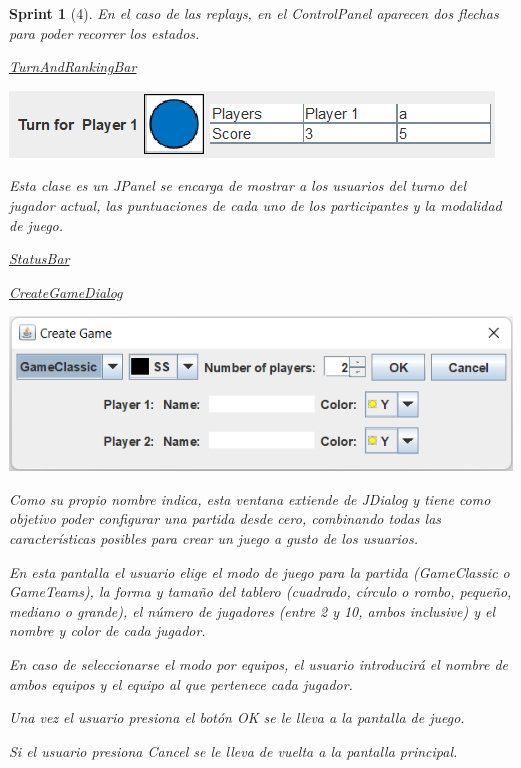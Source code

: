 \documentclass[12pt,a4paper,openright]{book}
\theoremstyle{break}
\newtheorem*{sprint}{Sprint}
\begin{document}
\begin{sprint}[4]
En el caso de las \textit{replays}, en el \textit{ControlPanel} aparecen dos flechas para poder recorrer los estados.

\underline{TurnAndRankingBar}
\begin{center}
\includegraphics[scale=1]{turn-ranking-panel-sprint3.png}
\end{center}

Esta clase es un \textit{JPanel} se encarga de mostrar a los usuarios del turno del jugador actual, las puntuaciones de cada uno de los participantes y la modalidad de juego.

\underline{StatusBar}


\underline{CreateGameDialog}
\begin{center}
\includegraphics[scale=0.8]{create-game-sprint3.png}
\end{center}

Como su propio nombre indica, esta ventana extiende de \textit{JDialog} y tiene como objetivo poder configurar una partida desde cero, combinando todas las características posibles para crear un juego a gusto de los usuarios.

En esta pantalla el usuario elige el modo de juego para la partida (\textit{GameClassic} o \textit{GameTeams}), la forma y tamaño del tablero (cuadrado, círculo o rombo, pequeño, mediano o grande), el número de jugadores (entre 2 y 10, ambos inclusive) y el nombre y color de cada jugador.

En caso de seleccionarse el modo por equipos, el usuario introducirá el nombre de ambos equipos y el equipo al que pertenece cada jugador.

Una vez el usuario presiona el botón \textit{OK} se le lleva a la pantalla de juego.

Si el usuario presiona \textit{Cancel} se le lleva de vuelta a la pantalla principal.


\end{sprint}
\end{document}

